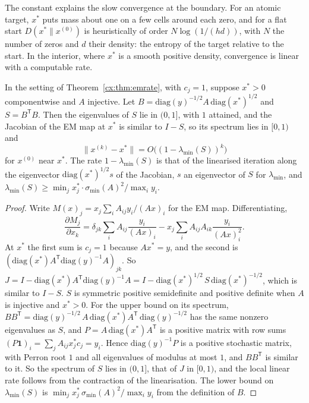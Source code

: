 The constant explains the slow convergence at the boundary. For an atomic target, $x^*$ puts mass about one on a few cells around each zero, and for a flat start $D(x^*\|x^{(0)})$ is heuristically of order $N\log(1/(hd))$, with $N$ the number of zeros and $d$ their density: the entropy of the target relative to the start. In the interior, where $x^*$ is a smooth positive density, convergence is linear with a computable rate.

\begin{theorem}\label{cx:thm:linear}
In the setting of Theorem~\ref{cx:thm:emrate}, with $c_j=1$, suppose $x^*>0$ componentwise and $A$ injective. Let $B=\mathrm{diag}(y)^{-1/2}A\,\mathrm{diag}(x^*)^{1/2}$ and $S=B^{\mathsf T}B$. Then the eigenvalues of $S$ lie in $(0,1]$, with $1$ attained, and the Jacobian of the EM map at $x^*$ is similar to $I-S$, so its spectrum lies in $[0,1)$ and
\[
\|x^{(k)}-x^*\|=O\bigl((1-\lambda_{\min}(S))^{k}\bigr)
\]
for $x^{(0)}$ near $x^*$. The rate $1-\lambda_{\min}(S)$ is that of the linearised iteration along the eigenvector $\mathrm{diag}(x^*)^{1/2}s$ of the Jacobian, $s$ an eigenvector of $S$ for $\lambda_{\min}$, and $\lambda_{\min}(S)\ge\min_jx_j^*\cdot\sigma_{\min}(A)^2/\max_iy_i$.
\end{theorem}

\begin{proof}
Write $M(x)_j=x_j\sum_iA_{ij}y_i/(Ax)_i$ for the EM map. Differentiating,
\[
\frac{\partial M_j}{\partial x_k}=\delta_{jk}\sum_iA_{ij}\frac{y_i}{(Ax)_i}-x_j\sum_iA_{ij}A_{ik}\frac{y_i}{(Ax)_i^2}.
\]
At $x^*$ the first sum is $c_j=1$ because $Ax^*=y$, and the second is $(\mathrm{diag}(x^*)A^{\mathsf T}\mathrm{diag}(y)^{-1}A)_{jk}$. So $J=I-\mathrm{diag}(x^*)A^{\mathsf T}\mathrm{diag}(y)^{-1}A=I-\mathrm{diag}(x^*)^{1/2}\,S\,\mathrm{diag}(x^*)^{-1/2}$, which is similar to $I-S$. $S$ is symmetric positive semidefinite and positive definite when $A$ is injective and $x^*>0$. For the upper bound on its spectrum, $BB^{\mathsf T}=\mathrm{diag}(y)^{-1/2}\,A\,\mathrm{diag}(x^*)A^{\mathsf T}\,\mathrm{diag}(y)^{-1/2}$ has the same nonzero eigenvalues as $S$, and $P=A\,\mathrm{diag}(x^*)A^{\mathsf T}$ is a positive matrix with row sums $(P\mathbf 1)_i=\sum_jA_{ij}x_j^*c_j=y_i$. Hence $\mathrm{diag}(y)^{-1}P$ is a positive stochastic matrix, with Perron root $1$ and all eigenvalues of modulus at most $1$, and $BB^{\mathsf T}$ is similar to it. So the spectrum of $S$ lies in $(0,1]$, that of $J$ in $[0,1)$, and the local linear rate follows from the contraction of the linearisation. The lower bound on $\lambda_{\min}(S)$ is $\min_jx_j^*\,\sigma_{\min}(A)^2/\max_iy_i$ from the definition of $B$.
\end{proof}

